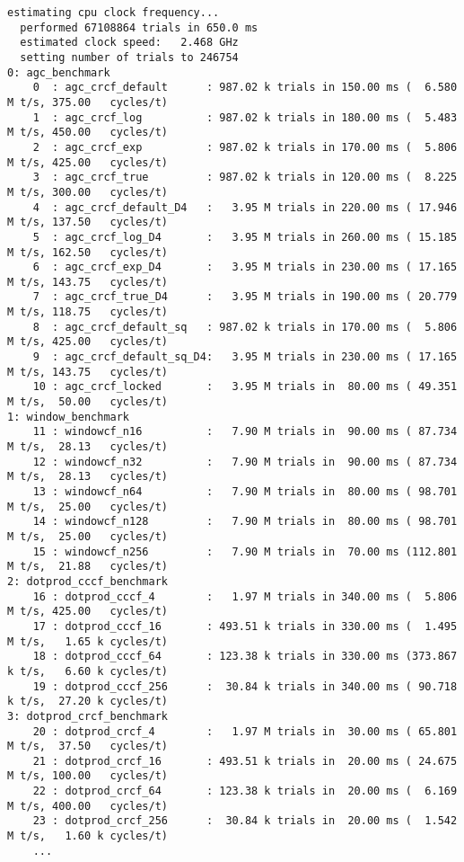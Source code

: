 \begin{Verbatim}[fontsize=\footnotesize]
  estimating cpu clock frequency...
  performed 67108864 trials in 650.0 ms
  estimated clock speed:   2.468 GHz
  setting number of trials to 246754
0: agc_benchmark
    0  : agc_crcf_default      : 987.02 k trials in 150.00 ms (  6.580 M t/s, 375.00   cycles/t)
    1  : agc_crcf_log          : 987.02 k trials in 180.00 ms (  5.483 M t/s, 450.00   cycles/t)
    2  : agc_crcf_exp          : 987.02 k trials in 170.00 ms (  5.806 M t/s, 425.00   cycles/t)
    3  : agc_crcf_true         : 987.02 k trials in 120.00 ms (  8.225 M t/s, 300.00   cycles/t)
    4  : agc_crcf_default_D4   :   3.95 M trials in 220.00 ms ( 17.946 M t/s, 137.50   cycles/t)
    5  : agc_crcf_log_D4       :   3.95 M trials in 260.00 ms ( 15.185 M t/s, 162.50   cycles/t)
    6  : agc_crcf_exp_D4       :   3.95 M trials in 230.00 ms ( 17.165 M t/s, 143.75   cycles/t)
    7  : agc_crcf_true_D4      :   3.95 M trials in 190.00 ms ( 20.779 M t/s, 118.75   cycles/t)
    8  : agc_crcf_default_sq   : 987.02 k trials in 170.00 ms (  5.806 M t/s, 425.00   cycles/t)
    9  : agc_crcf_default_sq_D4:   3.95 M trials in 230.00 ms ( 17.165 M t/s, 143.75   cycles/t)
    10 : agc_crcf_locked       :   3.95 M trials in  80.00 ms ( 49.351 M t/s,  50.00   cycles/t)
1: window_benchmark
    11 : windowcf_n16          :   7.90 M trials in  90.00 ms ( 87.734 M t/s,  28.13   cycles/t)
    12 : windowcf_n32          :   7.90 M trials in  90.00 ms ( 87.734 M t/s,  28.13   cycles/t)
    13 : windowcf_n64          :   7.90 M trials in  80.00 ms ( 98.701 M t/s,  25.00   cycles/t)
    14 : windowcf_n128         :   7.90 M trials in  80.00 ms ( 98.701 M t/s,  25.00   cycles/t)
    15 : windowcf_n256         :   7.90 M trials in  70.00 ms (112.801 M t/s,  21.88   cycles/t)
2: dotprod_cccf_benchmark
    16 : dotprod_cccf_4        :   1.97 M trials in 340.00 ms (  5.806 M t/s, 425.00   cycles/t)
    17 : dotprod_cccf_16       : 493.51 k trials in 330.00 ms (  1.495 M t/s,   1.65 k cycles/t)
    18 : dotprod_cccf_64       : 123.38 k trials in 330.00 ms (373.867 k t/s,   6.60 k cycles/t)
    19 : dotprod_cccf_256      :  30.84 k trials in 340.00 ms ( 90.718 k t/s,  27.20 k cycles/t)
3: dotprod_crcf_benchmark
    20 : dotprod_crcf_4        :   1.97 M trials in  30.00 ms ( 65.801 M t/s,  37.50   cycles/t)
    21 : dotprod_crcf_16       : 493.51 k trials in  20.00 ms ( 24.675 M t/s, 100.00   cycles/t)
    22 : dotprod_crcf_64       : 123.38 k trials in  20.00 ms (  6.169 M t/s, 400.00   cycles/t)
    23 : dotprod_crcf_256      :  30.84 k trials in  20.00 ms (  1.542 M t/s,   1.60 k cycles/t)
    ...
\end{Verbatim}
